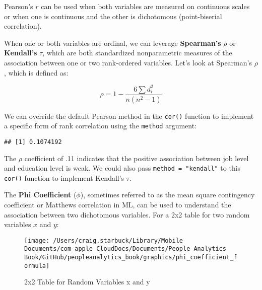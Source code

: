 \documentclass[
]{book}
\newenvironment{Shaded}{\begin{snugshade}}{\end{snugshade}}
\newcommand{\AttributeTok}[1]{\textcolor[rgb]{0.77,0.63,0.00}{#1}}
\newcommand{\CommentTok}[1]{\textcolor[rgb]{0.56,0.35,0.01}{\textit{#1}}}
\newcommand{\FunctionTok}[1]{\textcolor[rgb]{0.00,0.00,0.00}{#1}}
\newcommand{\NormalTok}[1]{#1}
\newcommand{\SpecialCharTok}[1]{\textcolor[rgb]{0.00,0.00,0.00}{#1}}
\newcommand{\StringTok}[1]{\textcolor[rgb]{0.31,0.60,0.02}{#1}}
\begin{document}
Pearson's \(r\) can be used when both variables are measured on continuous scales or when one is continuous and the other is dichotomous (point-biserial correlation).

When one or both variables are ordinal, we can leverage \textbf{Spearman's} \(\rho\) or \textbf{Kendall's} \(\tau\), which are both standardized nonparametric measures of the association between one or two rank-ordered variables. Let's look at Spearman's \(\rho\), which is defined as:

\[ \rho = 1 - {\frac {6 \sum d_i^2}{n(n^2 - 1)}} \]

We can override the default Pearson method in the \texttt{cor()} function to implement a specific form of rank correlation using the \texttt{method} argument:

\begin{Shaded}
\end{Shaded}

\begin{verbatim}
## [1] 0.1074192
\end{verbatim}

The \(\rho\) coefficient of .11 indicates that the positive association between job level and education level is weak. We could also pass \texttt{method\ =\ "kendall"} to this \texttt{cor()} function to implement Kendall's \(\tau\).

The \textbf{Phi Coefficient} (\(\phi\)), sometimes referred to as the mean square contingency coefficient or Matthews correlation in ML, can be used to understand the association between two dichotomous variables. For a 2x2 table for two random variables \(x\) and \(y\):

\begin{figure}

{\centering \texttt{[image: /Users/craig.starbuck/Library/Mobile Documents/com~apple~CloudDocs/Documents/People Analytics Book/GitHub/peopleanalytics\_book/graphics/phi\_coefficient\_formula]} 

}

\caption{2x2 Table for Random Variables x and y}\label{fig:phi-tbl}
\end{figure}
\end{document}
